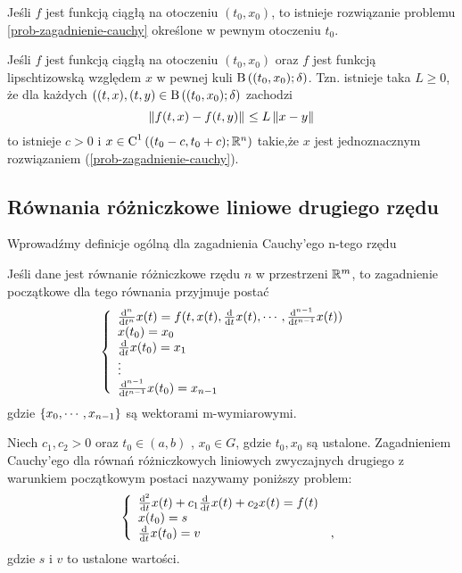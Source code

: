 \documentclass[12pt,a4paper]{report}
\begin{document}
\begin{theorem}
Jeśli $f$ jest funkcją ciągłą na otoczeniu $(t_{0},x_{0})$, to istnieje rozwiązanie problemu \ref{prob-zagadnienie-cauchy} określone w pewnym otoczeniu $t_{0}$. 
\end{theorem}

\begin{theorem}
Jeśli $f$ jest funkcją ciągłą na otoczeniu $(t_{0},x_{0})$ oraz $f$ jest funkcją lipschtizowską względem $x$ w pewnej kuli $\ball{(t_0,x_0)}{\delta}$. Tzn.
 istnieje taka $L\geq 0$, że dla każdych $((t,x),(t,y) \in \ball{(t_0,x_0)}{\delta} $ zachodzi
$$
  \norm{f(t,x) - f(t,y)} \leq L \norm{ x-y} 
$$
 to istnieje $ c> 0 $ i $x \in \Ck{1}{(t_0-c,t_0+c); \setR^{n} }  $ takie,że $x$ jest jednoznacznym rozwiązaniem (\ref{prob-zagadnienie-cauchy}).
\end{theorem}
\subsection{Równania różniczkowe liniowe drugiego rzędu }
Wprowadźmy definicje ogólną dla zagadnienia Cauchy'ego n-tego rzędu
\begin{definition}
Jeśli dane jest równanie różniczkowe rzędu $n$ w przestrzeni $\setR^m$, to zagadnienie początkowe dla tego równania przyjmuje postać 
\begin{equation} 
\left\{\begin{array}{ll}
\ddx[^n]{t^n} x(t) = f(t,x(t), \ddx{t}x(t), \cdots, \ddx[^{n-1}]{t^{n-1}}x(t)) &   \\
x(t_0) = x_0 & \\
\ddx{t}x(t_0) = x_1 & \\
\vdots & \\
\ddx[^{n-1}]{t^{n-1}}x(t_0) = x_{n-1} &
\end{array} \right.
\end{equation}
gdzie $ \set{x_0,\cdots,x_{n-1}}$ są wektorami m-wymiarowymi. 
\end{definition}

\begin{problem}
Niech $c_1 , c_2 >0 $ oraz $t_0 \in (a,b) $ , $ x_0 \in G $, gdzie $t_0, x_0$ są ustalone.
Zagadnieniem Cauchy'ego dla równań różniczkowych liniowych zwyczajnych drugiego z warunkiem początkowym postaci nazywamy poniższy problem:
\begin{equation}
\left\{\begin{array}{ll}
\ddx [^2]{t} x(t) + c_1\ddx{t} x(t) + c_2x(t) = f(t) & \\
x(t_0) = s & \\
\ddx{t} x(t_0) = v &,
\end{array} \right.
\end{equation}
gdzie $ s$ i $v$ to ustalone wartości.
\end{problem}
\end{document}

